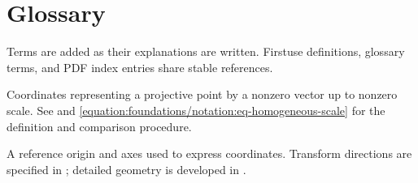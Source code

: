 \documentclass[letterpaper,11pt,english,openany,oneside]{jupyterBook}
\begin{document}
\chapter{Glossary}
\label{\detokenize{reference/glossary:glossary}}\label{\detokenize{reference/glossary:id1}}\label{\detokenize{reference/glossary::doc}}
\sphinxAtStartPar
Terms are added as their explanations are written. First\sphinxhyphen{}use definitions, glossary terms, and PDF index entries share stable references.
\begin{description}
\sphinxAtStartPar
Coordinates representing a projective point by a nonzero vector up to nonzero scale. See {\hyperref[\detokenize{foundations/notation:notation}]{}} and \eqref{equation:foundations/notation:eq-homogeneous-scale} for the definition and comparison procedure.

\sphinxAtStartPar
A reference origin and axes used to express coordinates. Transform directions are specified in {\hyperref[\detokenize{foundations/notation:notation}]{}}; detailed geometry is developed in {\hyperref[\detokenize{lectures/lecture01/frames-quizzes:lec01-frames}]{}}.

\end{description}
\end{document}
